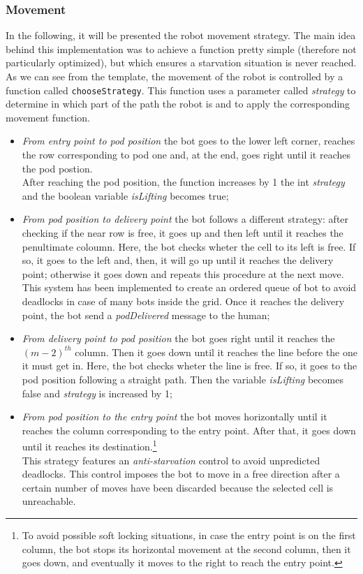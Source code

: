 \documentclass{article}
\begin{document}
			\subsubsection{Movement}
				In the following, it will be presented the robot movement strategy. The main idea behind this implementation was to achieve a function pretty simple (therefore not particularly optimized), but which ensures a starvation situation is never reached.\\
				As we can see from the template, the movement of the robot is controlled by a function called \verb|chooseStrategy|. This function uses a parameter called \emph{strategy} to determine in which part of the path the robot is and to apply the corresponding movement function.
				\begin{itemize}
					\item \emph{From entry point to pod position} the bot goes to the lower left corner, reaches the row corresponding to pod one and, at the end, goes right until it reaches the pod postion.\\After reaching the pod position, the function increases by 1 the int \emph{strategy} and the boolean variable \emph{isLifting} becomes true;
					\item \emph{From pod position to delivery point} the bot follows a different strategy: after checking if the near row is free, it goes up and then left until it reaches the penultimate coloumn. Here, the bot checks wheter the cell to its left is free. If so, it goes to the left and, then, it will go up until it reaches the delivery point; otherwise it goes down and repeats this procedure at the next move. This system has been implemented to create an ordered queue of bot to avoid deadlocks in case of many bots inside the grid. Once it reaches the delivery point, the bot send a \emph{podDelivered} message to the human;
					\item \emph{From delivery point to pod position} the bot goes right until it reaches the ${(m-2)}^{th}$ column. Then it goes down until it reaches the line before the one it must get in. Here, the bot checks wheter the line is free. If so, it goes to the pod position following a straight path. Then the variable \emph{isLifting} becomes false and \emph{strategy} is increased by 1;
					\item \emph{From pod position to the entry point} the bot moves horizontally until it reaches the column corresponding to the entry point. After that, it goes down until it reaches its destination.\footnote{To avoid possible soft locking situations, in case the entry point is on the first column, the bot stops its horizontal movement at the second column, then it goes down, and eventually it moves to the right to reach the entry point.}\\This strategy features an \emph{anti-starvation} control to avoid unpredicted deadlocks. This control imposes the bot to move in a free direction after a certain number of moves have been discarded because the selected cell is unreachable.
				\end{itemize}
\end{document}
